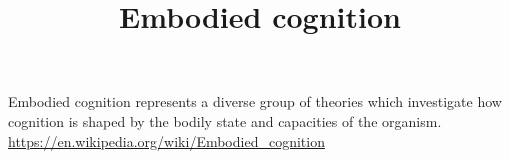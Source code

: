 \documentclass[a4paper]{standalone}
\title{Embodied cognition}
\begin{document}
    \maketitle
    Embodied cognition represents a diverse group of theories which investigate how cognition is shaped by the bodily state and capacities of the organism.
    \url{https://en.wikipedia.org/wiki/Embodied_cognition}
\end{document}
